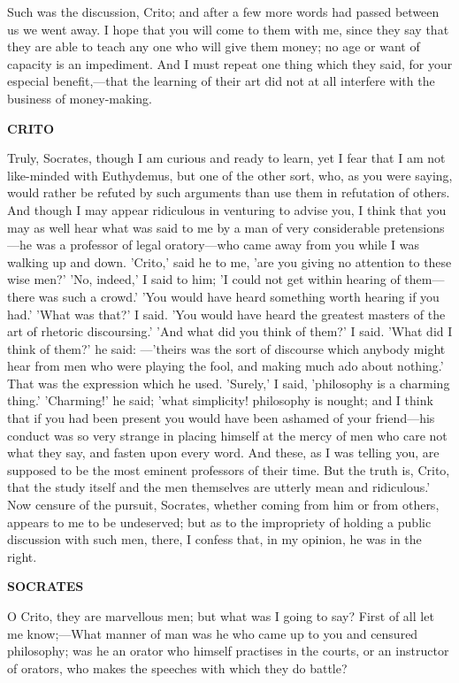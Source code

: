 \documentclass[11pt,letter]{article}
\begin{document}
\par  Such was the discussion, Crito; and after a few more words had passed between us we went away. I hope that you will come to them with me, since they say that they are able to teach any one who will give them money; no age or want of capacity is an impediment. And I must repeat one thing which they said, for your especial benefit,—that the learning of their art did not at all interfere with the business of money-making.

\par \textbf{CRITO}
\par   Truly, Socrates, though I am curious and ready to learn, yet I fear that I am not like-minded with Euthydemus, but one of the other sort, who, as you were saying, would rather be refuted by such arguments than use them in refutation of others. And though I may appear ridiculous in venturing to advise you, I think that you may as well hear what was said to me by a man of very considerable pretensions—he was a professor of legal oratory—who came away from you while I was walking up and down. 'Crito,' said he to me, 'are you giving no attention to these wise men?' 'No, indeed,' I said to him; 'I could not get within hearing of them—there was such a crowd.' 'You would have heard something worth hearing if you had.' 'What was that?' I said. 'You would have heard the greatest masters of the art of rhetoric discoursing.' 'And what did you think of them?' I said. 'What did I think of them?' he said: —'theirs was the sort of discourse which anybody might hear from men who were playing the fool, and making much ado about nothing.' That was the expression which he used. 'Surely,' I said, 'philosophy is a charming thing.' 'Charming!' he said; 'what simplicity! philosophy is nought; and I think that if you had been present you would have been ashamed of your friend—his conduct was so very strange in placing himself at the mercy of men who care not what they say, and fasten upon every word. And these, as I was telling you, are supposed to be the most eminent professors of their time. But the truth is, Crito, that the study itself and the men themselves are utterly mean and ridiculous.' Now censure of the pursuit, Socrates, whether coming from him or from others, appears to me to be undeserved; but as to the impropriety of holding a public discussion with such men, there, I confess that, in my opinion, he was in the right.

\par \textbf{SOCRATES}
\par   O Crito, they are marvellous men; but what was I going to say? First of all let me know;—What manner of man was he who came up to you and censured philosophy; was he an orator who himself practises in the courts, or an instructor of orators, who makes the speeches with which they do battle?
\end{document}
